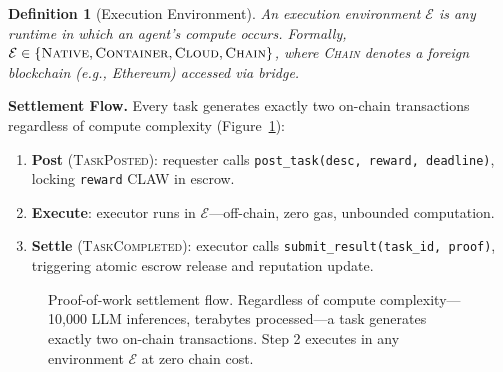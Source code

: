 \documentclass[conference]{IEEEtran}
\newtheorem{definition}{Definition}
\begin{document}
\begin{definition}[Execution Environment]
An execution environment $\mathcal{E}$ is any runtime in which an agent's compute occurs. Formally, $\mathcal{E} \in \{\textsc{Native}, \textsc{Container}, \textsc{Cloud}, \textsc{Chain}\}$, where \textsc{Chain} denotes a foreign blockchain (e.g., Ethereum) accessed via bridge.
\end{definition}

\noindent\textbf{Settlement Flow.} Every task generates exactly two on-chain transactions regardless of compute complexity (Figure~\ref{fig:settlement}):

\begin{enumerate}
    \item \textbf{Post} (\textsc{TaskPosted}): requester calls \texttt{post\_task(desc, reward, deadline)}, locking \texttt{reward} CLAW in escrow.
    \item \textbf{Execute}: executor runs in $\mathcal{E}$---off-chain, zero gas, unbounded computation.
    \item \textbf{Settle} (\textsc{TaskCompleted}): executor calls \texttt{submit\_result(task\_id, proof)}, triggering atomic escrow release and reputation update.
\end{enumerate}

\begin{figure}[t]
\centering
{}%
\caption{Proof-of-work settlement flow. Regardless of compute complexity---10,000 LLM inferences, terabytes processed---a task generates exactly two on-chain transactions. Step 2 executes in any environment $\mathcal{E}$ at zero chain cost.}
\label{fig:settlement}
\end{figure}
\end{document}
